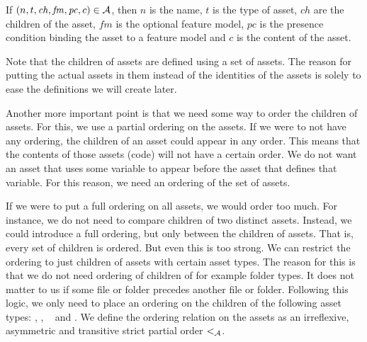 If \( \left( n, t, \mathit{ch}, \mathit{fm}, \mathit{pc}, c \right) \in \mathcal{A} \), then \(n\) is the
name, \(t\) is the type of asset, \(\mathit{ch}\) are the children of the asset, 
\(\mathit{fm}\) is the optional feature model, \(\mathit{pc}\) is the presence condition binding
the asset to a feature model and \(c\) is the content of the asset.

Note that the children of assets are defined using a set of assets. The reason
for putting the actual assets in them instead of the identities of the assets
is solely to ease the definitions we will create later.

Another more important point is that we need some way to order the children of
assets. For this, we use a partial ordering on the assets. If we were to not 
have any ordering, the children of an asset could appear in any order. This
means that the contents of those assets (code) will not have a certain order. We do
not want an asset that uses some variable to appear before the asset that 
defines that variable. For this reason, we need an ordering of the set of
assets. 

If we were to put a full ordering on all assets, we would order too much. For
instance, we do not need to compare children of two distinct assets.
Instead, we could introduce a full ordering, but only between the children of
assets. That is, every set of children is ordered. But even this is too strong.
We can restrict the ordering to just children of assets with certain asset
types. The reason for this is that we do not need ordering of children of for
example folder types. It does not matter to us if some file or folder precedes
another file or folder. Following this logic, we only need to place an ordering
on the children of the following asset types: \assetfiletype, \assetclasstype,
\assetmethodtype~ and \assetblocktype. We define the ordering relation on the 
assets as an irreflexive, asymmetric and transitive strict partial order
\(<_{\mathcal{A}}\).

